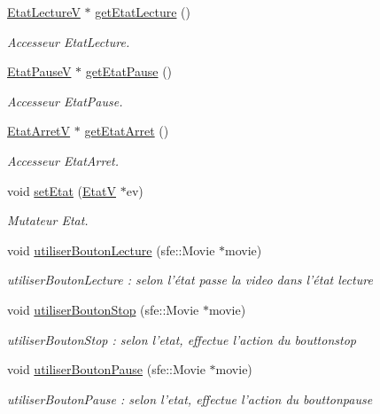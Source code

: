\begin{DoxyCompactItemize}
\item 
\hyperlink{classEtatLectureV}{Etat\+Lecture\+V} $\ast$ \hyperlink{classVideo_aee3ef41850206dac939f736e5b97c73c}{get\+Etat\+Lecture} ()
\begin{DoxyCompactList}\small\item\em Accesseur Etat\+Lecture. \end{DoxyCompactList}\item 
\hyperlink{classEtatPauseV}{Etat\+Pause\+V} $\ast$ \hyperlink{classVideo_a91f40f05211f5b45e772d8bf68de7562}{get\+Etat\+Pause} ()
\begin{DoxyCompactList}\small\item\em Accesseur Etat\+Pause. \end{DoxyCompactList}\item 
\hyperlink{classEtatArretV}{Etat\+Arret\+V} $\ast$ \hyperlink{classVideo_a84d7495527cd76e6347bf85b2ec6e0ab}{get\+Etat\+Arret} ()
\begin{DoxyCompactList}\small\item\em Accesseur Etat\+Arret. \end{DoxyCompactList}\item 
void \hyperlink{classVideo_a515d17189869141a80223055997179c5}{set\+Etat} (\hyperlink{classEtatV}{Etat\+V} $\ast$ev)
\begin{DoxyCompactList}\small\item\em Mutateur Etat. \end{DoxyCompactList}\item 
void \hyperlink{classVideo_a8d3ea9525063ce97483e813e11ce4a6a}{utiliser\+Bouton\+Lecture} (sfe\+::\+Movie $\ast$movie)
\begin{DoxyCompactList}\small\item\em utiliser\+Bouton\+Lecture \+: selon l'état passe la video dans l'état lecture \end{DoxyCompactList}\item 
void \hyperlink{classVideo_a93e76d0b95693e0000035e52775bd6d4}{utiliser\+Bouton\+Stop} (sfe\+::\+Movie $\ast$movie)
\begin{DoxyCompactList}\small\item\em utiliser\+Bouton\+Stop \+: selon l'etat, effectue l'action du bouttonstop \end{DoxyCompactList}\item 
void \hyperlink{classVideo_a78f816a4576618435c101756a96daea0}{utiliser\+Bouton\+Pause} (sfe\+::\+Movie $\ast$movie)
\begin{DoxyCompactList}\small\item\em utiliser\+Bouton\+Pause \+: selon l'etat, effectue l'action du bouttonpause \end{DoxyCompactList}\end{DoxyCompactItemize}


